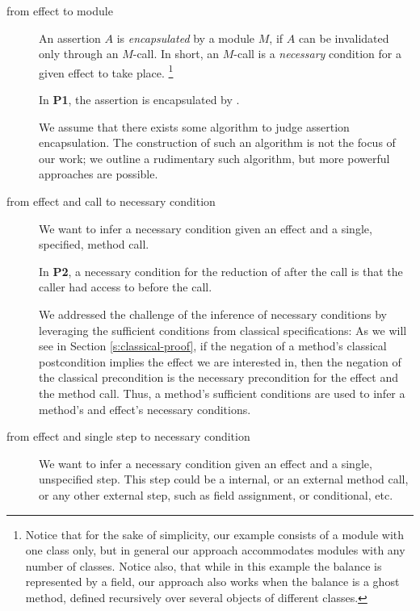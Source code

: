 \begin{description}
  \item[from effect to module]  An assertion $A$  is
\emph{encapsulated} by a module $M$, if  $A$ can be invalidated only through
    an $M$-\internalC call. 
  In short, an $M$-\internalC call is a \emph{necessary} condition for
a given effect to take place.
\footnote{Notice that for the sake of simplicity, our example consists of a module with one class only, but 
    in general our approach accommodates modules with any number of classes.
     Notice also, that while in this example  the balance is 
represented by a field, our approach also works when the balance is a ghost method, defined 
recursively over several objects of different classes.}

In \textbf{P1}, the assertion  is encapsulated by .

We assume that there exists some algorithm to judge assertion encapsulation.
The construction of such an algorithm is not the focus of our work;
  we  outline a rudimentary such algorithm, but more powerful
approaches are possible. 
 

\item[from effect and call to necessary condition] We want to infer
a necessary condition given an effect and
a single, specified, method call. 

In \textbf{P2},   a necessary condition for the  reduction of   after the call  is that the caller  had access to  before the call.

We addressed the challenge of the inference of necessary conditions 
 by leveraging the sufficient conditions from classical specifications:
 As we will see in Section \ref{s:classical-proof}, 
if the negation of a method's
 classical postcondition implies  the effect we are interested in, then the negation of the 
 classical precondition  is the necessary precondition for the effect and the method call. Thus, 
  a method's sufficient conditions are used to infer a method's and effect's necessary conditions.


\item[from effect and single step to necessary condition]  We want to infer
a necessary condition given an effect and
a single, unspecified step. This step could be a internal, or an external method call,
or any other external step, such as field assignment, or conditional, etc.


\end{description}
